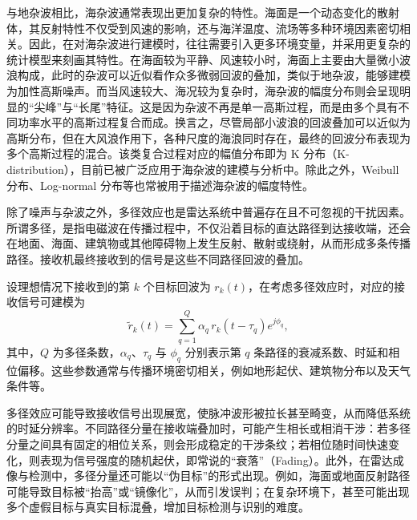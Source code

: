 与地杂波相比，海杂波通常表现出更加复杂的特性。海面是一个动态变化的散射体，其反射特性不仅受到风速的影响，还与海洋温度、流场等多种环境因素密切相关。因此，在对海杂波进行建模时，往往需要引入更多环境变量，并采用更复杂的统计模型来刻画其特性。在海面较为平静、风速较小时，海面上主要由大量微小波浪构成，此时的杂波可以近似看作众多微弱回波的叠加，类似于地杂波，能够建模为加性高斯噪声。而当风速较大、海况较为复杂时，海杂波的幅度分布则会呈现明显的“尖峰”与“长尾”特征。这是因为杂波不再是单一高斯过程，而是由多个具有不同功率水平的高斯过程复合而成。换言之，尽管局部小波浪的回波叠加可以近似为高斯分布，但在大风浪作用下，各种尺度的海浪同时存在，最终的回波分布表现为多个高斯过程的混合。该类复合过程对应的幅值分布即为 K 分布（K-distribution），目前已被广泛应用于海杂波的建模与分析中。除此之外，Weibull 分布、Log-normal 分布等也常被用于描述海杂波的幅度特性。

除了噪声与杂波之外，多径效应也是雷达系统中普遍存在且不可忽视的干扰因素。所谓多径，是指电磁波在传播过程中，不仅沿着目标的直达路径到达接收端，还会在地面、海面、建筑物或其他障碍物上发生反射、散射或绕射，从而形成多条传播路径。接收机最终接收到的信号是这些不同路径回波的叠加。

设理想情况下接收到的第 \( k \) 个目标回波为 \( r_k(t) \)，在考虑多径效应时，对应的接收信号可建模为
\begin{equation}
    \tilde{r}_k(t) = \sum_{q=1}^{Q} \alpha_q \, r_k\!\left(t - \tau_q\right) e^{j \phi_q},
\end{equation}
其中，\( Q \) 为多径条数，\(\alpha_q\)、\(\tau_q\) 与 \(\phi_q\) 分别表示第 \( q \) 条路径的衰减系数、时延和相位偏移。这些参数通常与传播环境密切相关，例如地形起伏、建筑物分布以及天气条件等。

多径效应可能导致接收信号出现展宽，使脉冲波形被拉长甚至畸变，从而降低系统的时延分辨率。不同路径分量在接收端叠加时，可能产生相长或相消干涉：若多径分量之间具有固定的相位关系，则会形成稳定的干涉条纹；若相位随时间快速变化，则表现为信号强度的随机起伏，即常说的``衰落''（Fading）。此外，在雷达成像与检测中，多径分量还可能以``伪目标''的形式出现。例如，海面或地面反射路径可能导致目标被``抬高''或``镜像化''，从而引发误判；在复杂环境下，甚至可能出现多个虚假目标与真实目标混叠，增加目标检测与识别的难度。
